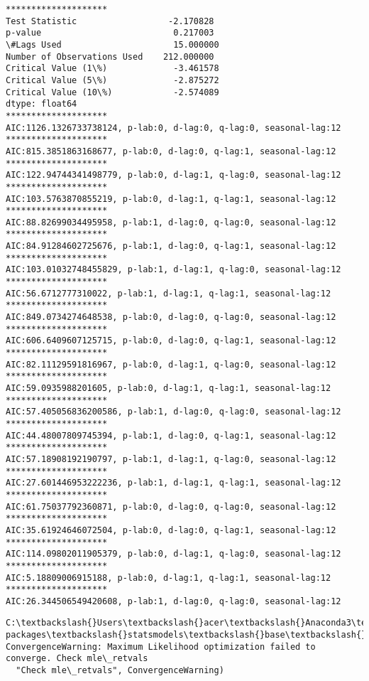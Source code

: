 \documentclass[11pt]{article}
\begin{document}
    \begin{Verbatim}[commandchars=\\\{\}]
********************
Test Statistic                  -2.170828
p-value                          0.217003
\#Lags Used                      15.000000
Number of Observations Used    212.000000
Critical Value (1\%)             -3.461578
Critical Value (5\%)             -2.875272
Critical Value (10\%)            -2.574089
dtype: float64
********************
AIC:1126.1326733738124, p-lab:0, d-lag:0, q-lag:0, seasonal-lag:12
********************
AIC:815.3851863168677, p-lab:0, d-lag:0, q-lag:1, seasonal-lag:12
********************
AIC:122.94744341498779, p-lab:0, d-lag:1, q-lag:0, seasonal-lag:12
********************
AIC:103.5763870855219, p-lab:0, d-lag:1, q-lag:1, seasonal-lag:12
********************
AIC:88.82699034495958, p-lab:1, d-lag:0, q-lag:0, seasonal-lag:12
********************
AIC:84.91284602725676, p-lab:1, d-lag:0, q-lag:1, seasonal-lag:12
********************
AIC:103.01032748455829, p-lab:1, d-lag:1, q-lag:0, seasonal-lag:12
********************
AIC:56.6712777310022, p-lab:1, d-lag:1, q-lag:1, seasonal-lag:12
********************
AIC:849.0734274648538, p-lab:0, d-lag:0, q-lag:0, seasonal-lag:12
********************
AIC:606.6409607125715, p-lab:0, d-lag:0, q-lag:1, seasonal-lag:12
********************
AIC:82.11129591816967, p-lab:0, d-lag:1, q-lag:0, seasonal-lag:12
********************
AIC:59.0935988201605, p-lab:0, d-lag:1, q-lag:1, seasonal-lag:12
********************
AIC:57.405056836200586, p-lab:1, d-lag:0, q-lag:0, seasonal-lag:12
********************
AIC:44.48007809745394, p-lab:1, d-lag:0, q-lag:1, seasonal-lag:12
********************
AIC:57.18908192190797, p-lab:1, d-lag:1, q-lag:0, seasonal-lag:12
********************
AIC:27.601446953222236, p-lab:1, d-lag:1, q-lag:1, seasonal-lag:12
********************
AIC:61.75037792360871, p-lab:0, d-lag:0, q-lag:0, seasonal-lag:12
********************
AIC:35.61924646072504, p-lab:0, d-lag:0, q-lag:1, seasonal-lag:12
********************
AIC:114.09802011905379, p-lab:0, d-lag:1, q-lag:0, seasonal-lag:12
********************
AIC:5.18809006915188, p-lab:0, d-lag:1, q-lag:1, seasonal-lag:12
********************
AIC:26.344506549420608, p-lab:1, d-lag:0, q-lag:0, seasonal-lag:12

    \end{Verbatim}

    \begin{Verbatim}[commandchars=\\\{\}]
C:\textbackslash{}Users\textbackslash{}acer\textbackslash{}Anaconda3\textbackslash{}lib\textbackslash{}site-packages\textbackslash{}statsmodels\textbackslash{}base\textbackslash{}model.py:508: ConvergenceWarning: Maximum Likelihood optimization failed to converge. Check mle\_retvals
  "Check mle\_retvals", ConvergenceWarning)

    \end{Verbatim}
\end{document}
